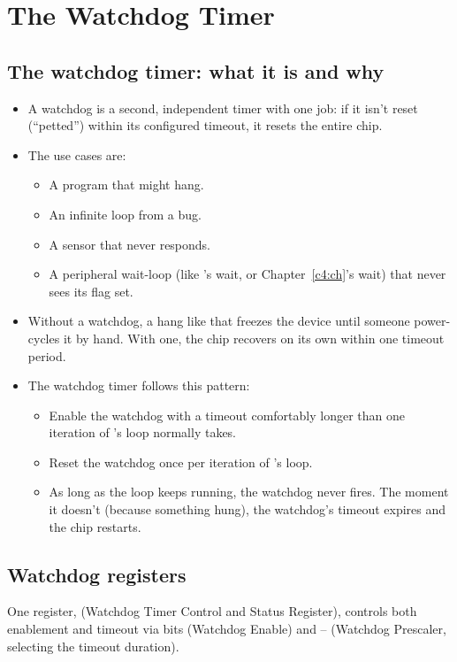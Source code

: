 
\section{The Watchdog Timer}
\label{c8:sec:watchdog}\label{c8:app:a}

\subsection{The watchdog timer: what it is and why}
\label{c8:a:1}
\begin{itemize}
  \item A watchdog is a second, independent timer with one job: if it isn't reset (``petted'')
    within its configured timeout, it resets the entire chip.
  \item The use cases are:
  \begin{itemize}
    \item A program that might hang.
    \item An infinite loop from a bug.
    \item A sensor that never responds.
    \item A peripheral wait-loop (like 's  wait, or Chapter~\ref{c4:ch}'s
       wait) that never sees its flag set.
  \end{itemize}
  \item Without a watchdog, a hang like that freezes the device until someone power-cycles it by
    hand. With one, the chip recovers on its own within one timeout period.
  \item The watchdog timer follows this pattern:
  \begin{itemize}
    \item Enable the watchdog with a timeout comfortably longer than one iteration of
      's loop normally takes.
    \item Reset the watchdog once per iteration of 's loop.
    \item As long as the loop keeps running, the watchdog never fires. The moment it doesn't
      (because something hung), the watchdog's timeout expires and the chip restarts.
  \end{itemize}
\end{itemize}

\subsection{Watchdog registers}
\label{c8:a:2}
One register, \textbf{} (Watchdog Timer Control and Status Register), controls both
enablement and timeout via bits  (Watchdog Enable) and -- (Watchdog
Prescaler, selecting the timeout duration).

